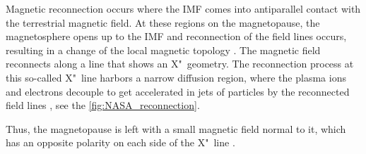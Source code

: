 Magnetic reconnection occurs where the IMF comes into antiparallel contact with the terrestrial magnetic field. At these regions on the magnetopause, the magnetosphere opens up to the IMF and reconnection of the field lines occurs, resulting in a change of the local magnetic topology \citep{Phan2005}. The magnetic field reconnects along a line that shows an X"~geometry. The reconnection process at this so-called X"~line harbors a narrow diffusion region, where the plasma ions and electrons decouple to get accelerated in jets of particles by the reconnected field lines \citep{Phan2005}, see the \autoref{fig:NASA_reconnection}.
\begin{figure}[htb]
\end{figure}
Thus, the magnetopause is left with a small magnetic field normal to it, which has an opposite polarity on each side of the X"~line \citep{DeKeyser2005}.

